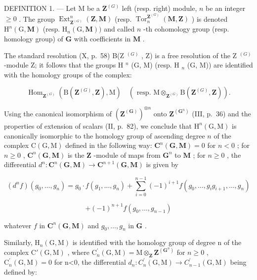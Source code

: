 DEFINITION 1. --- Let M be a \(\mathbf{Z}^{(G)}\) left (resp. right) module, \(n\) be an integer \(\geqslant 0\) . The group \(\operatorname{Ext}_{\mathbf{Z}^{(G)}}^{n}(\mathbf{Z}, \mathbf{M})\) (resp. \(\operatorname{Tor}_{n}^{\mathbf{Z}^{(G)}}(\mathbf{M}, \mathbf{Z})\) ) is denoted \(\mathrm{H}^{n}(\mathrm{G}, \mathbf{M})\) (resp. \(\mathrm{H}_{n}(\mathrm{G}, \mathbf{M}))\) and called \(n\) -th cohomology group (resp. homology group) of \(\mathbf{G}\) with coefficients in \(\mathbf{M}\) .

The standard resolution (X, p.~58) B(Z \(^{(G)}\) , Z) is a free resolution of the Z \(^{(G)}\) -module Z; it follows that the groups H \(^{n}\) (G, M) (resp. H \(_{n}\) (G, M)) are identified with the homology groups of the complex:

\[
\operatorname{Hom} _ {\mathbf {Z} ^ {(G)}} \left(\mathrm{B} (\mathbf {Z} ^ {(G)}, \mathbf {Z}), \mathrm{M}\right) \quad \left(\text { resp. } \mathrm{M} \otimes_ {\mathbf {Z} ^ {(G)}} \mathrm{B} (\mathbf {Z} ^ {(G)}, \mathbf {Z})\right).
\]

Using the canonical isomorphism of \((\mathbf{Z}^{(\mathbf{G})})^{\otimes n}\) onto \(\mathbf{Z}^{(\mathbf{G}^{n})}\) (III, p.~36) and the properties of extension of scalars (II, p.~82), we conclude that \(\mathrm{H}^n (\mathrm{G},\mathrm{M})\) is canonically isomorphic to the homology group of ascending degree \(n\) of the complex \(\mathrm{C(G,M)}\) defined in the following way: \(\mathbf{C}^n (\mathbf{G},\mathbf{M}) = 0\) for \(n < 0\) ; for \(n\geqslant 0\) , \(\mathbf{C}^n (\mathbf{G},\mathbf{M})\) is the \(\mathbf{Z}\) -module of maps from \(\mathbf{G}^n\) to \(\mathbf{M}\) ; for \(n\geqslant 0\) , the differential \(d^n:\mathbf{C}^n (\mathbf{G},\mathbf{M})\to \mathbf{C}^{n + 1}(\mathbf{G},\mathbf{M})\) is given by

\[
(d ^ {n} f) (g _ {0}, \dots , g _ {n}) = g _ {0} \cdot f (g _ {1}, \dots , g _ {n}) + \sum_ {i = 0} ^ {n - 1} (- 1) ^ {i + 1} f (g _ {0}, \dots , g _ {i} g _ {i + 1}, \dots , g _ {n})
\]

\[
+ (- 1) ^ {n + 1} f \left(g _ {0}, \dots , g _ {n - 1}\right)
\]

whatever \(f\) in \(\mathbf{C}^{n}(\mathbf{G},\mathbf{M})\) and \(g_{0},\ldots,g_{n}\) in \(\mathbf{G}\) .

Similarly, \(\mathrm{H}_{n}(\mathrm{G},\mathrm{M})\) is identified with the homology group of degree n of the complex \(\mathrm{C}'(\mathrm{G},\mathrm{M})\) , where \(\mathrm{C}_{n}^{\prime}(\mathrm{G},\mathrm{M})=\mathrm{M}\otimes_{\mathbf{Z}}\mathbf{Z}^{(\mathbf{G}^{n})}\) for \(n\geqslant0\) , \(\mathrm{C}_{n}^{\prime}(\mathrm{G},\mathrm{M})=0\) for n\textless0, the differential \(d_{n}:C_{n}^{\prime}(\mathrm{G},\mathrm{M})\to C_{n-1}^{\prime}(\mathrm{G},\mathrm{M})\) being defined by:

